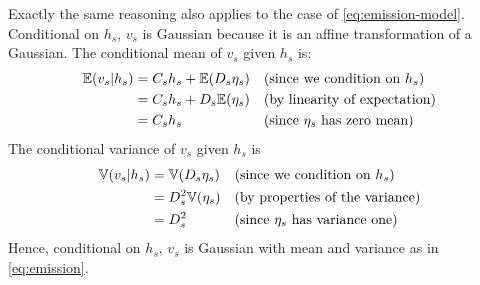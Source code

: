 \begin{exenumerate}
\begin{solution}
Exactly the same reasoning also applies to the case of
\eqref{eq:emission-model}. Conditional on $h_s$, $v_s$ is Gaussian
because it is an affine transformation of a Gaussian. The conditional mean of $v_s$ given $h_s$ is:
\begin{align}
  \mathbb{E}(v_s | h_s) & = C_s h_s + \mathbb{E}( D_s \eta_s) &&\text{(since we condition on $h_s$)}\\
  & = C_s h_s + D_s \mathbb{E}(\eta_s) && \text{(by linearity of expectation)}\\
  & = C_s h_s && \text{(since $\eta_s$ has zero mean)}
\end{align}
The conditional variance of $v_s$ given $h_s$ is
\begin{align}
  \mathbb{V}(v_s | h_s) & =  \mathbb{V}( D_s \eta_s) &&\text{(since we condition on $h_s$)}\\
  & = D_s^2 \mathbb{V}(\eta_s) && \text{(by properties of the variance)}\\
  & = D_s^2 && \text{(since $\eta_s$ has variance one)}
\end{align}
Hence, conditional on $h_s$, $v_s$ is Gaussian with mean and variance as in \eqref{eq:emission}.

\end{solution}


\end{exenumerate}
